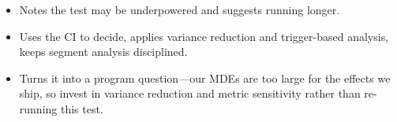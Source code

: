 \begin{interviewq}

\goodgreat
\begin{itemize}
    \item {} Notes the test may be underpowered and suggests running longer.
    \item {} Uses the CI to decide, applies variance reduction and trigger-based analysis, keeps segment analysis disciplined.
    \item {} Turns it into a program question---our MDEs are too large for the effects we ship, so invest in variance reduction and metric sensitivity rather than re-running this test.
\end{itemize}

\end{interviewq}


